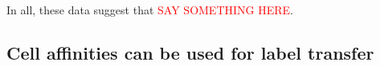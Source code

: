 \documentclass[10pt]{article}
\begin{document}


In all, these data suggest that \textcolor{red}{SAY SOMETHING HERE}.


\subsection*{Cell affinities can be used for label transfer}
\end{document}
